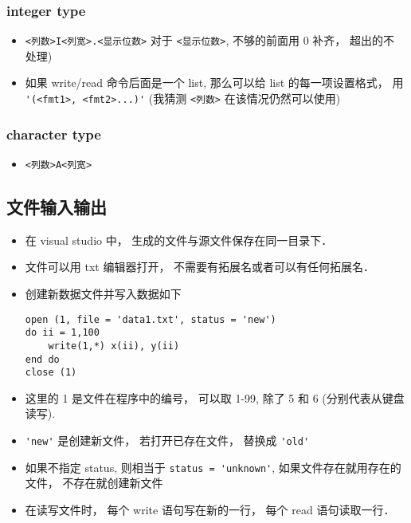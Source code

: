 \subsubsection{integer type}
\begin{itemize}
\item \verb|<列数>I<列宽>.<显示位数>|  对于 \verb|<显示位数>|, 不够的前面用 0 补齐， 超出的不
   处理)
\item 如果 write/read 命令后面是一个 list, 那么可以给 list 的每一项设置格式， 用 \verb|'(<fmt1>, <fmt2>...)'|  (我猜测 \verb|<列数>| 在该情况仍然可以使用)
\end{itemize}

\subsubsection{character type}
\begin{itemize}
\item \verb|<列数>A<列宽>|
\end{itemize}

\subsection{文件输入输出}
\begin{itemize}
\item 在 visual studio 中， 生成的文件与源文件保存在同一目录下．
\item 文件可以用 txt 编辑器打开， 不需要有拓展名或者可以有任何拓展名．
\item 创建新数据文件并写入数据如下
\begin{lstlisting}
open (1, file = 'data1.txt', status = 'new')
do ii = 1,100
	write(1,*) x(ii), y(ii)
end do
close (1)
\end{lstlisting}
\item 这里的 1 是文件在程序中的编号， 可以取 1-99, 除了 5 和 6 (分别代表从键盘读写).
\item \verb|'new'| 是创建新文件， 若打开已存在文件， 替换成 \verb|'old'|
\item 如果不指定 status, 则相当于 \verb|status = 'unknown'|, 如果文件存在就用存在的文件， 不存在就创建新文件
\item 在读写文件时， 每个 write 语句写在新的一行， 每个 read 语句读取一行．
\end{itemize}

